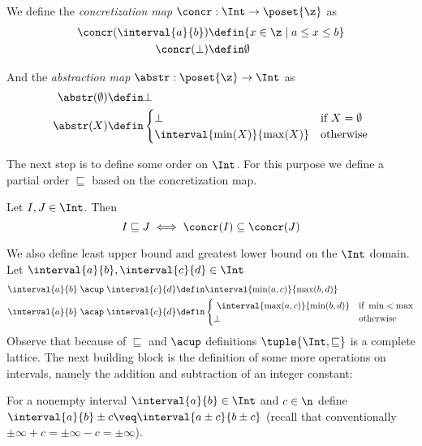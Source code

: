 \begin{definition}\label{def:concrint}
  We define the \emph{concretization map} \(\concr : \Int \to
  \poset{\z}\) as
  \begin{align*}
    \concr(\interval{a}{b}) & \defin \{x\in \z \mid a \leq x \leq b\} \\
    \concr(\bot) & \defin \emptyset
  \end{align*}

  And the \emph{abstraction map} \(\abstr:\poset{\z} \to \Int\) as
  \begin{align*}
    \abstr(\emptyset) & \defin \bot \\
    \abstr(X) & \defin
    \begin{cases}
      \bot & \text{if } X = \emptyset \\
      \interval{\min(X)}{\max(X)} & \text{otherwise}
    \end{cases}
  \end{align*}
\end{definition}
The next step is to define some order on \(\Int\). For this purpose
we define a partial order \(\sqsubseteq\) based on the concretization
map.
\begin{definition}\label{def:intpo}
  Let \(I,J \in \Int\). Then
  \begin{equation*}
    I \sqsubseteq J \iff \concr(I) \subseteq \concr(J)
  \end{equation*}
\end{definition}
We also define least upper bound and greatest lower bound on the
\(\Int\) domain. Let \({\interval{a}{b}, \interval{c}{d}\in \Int}\)
\begin{align*}
  \interval{a}{b} \; \acup \; \interval{c}{d} & \defin \interval{\min(a,c)}{\max(b,d)} \\
  \interval{a}{b} \; \acap \; \interval{c}{d} & \defin
                                                \begin{cases} \
                                                  \interval{\max(a,c)}{\min(b,d)} & \text{if } \min < \max \\
                                                  \bot & \text{otherwise}
                                                \end{cases}
\end{align*}
\noindent
Observe that because of \(\sqsubseteq\) and \(\acup\) definitions
\(\tuple{\Int,\sqsubseteq}\) is a complete lattice.  The next building
block is the definition of some more operations on intervals, namely
the addition and subtraction of an integer constant:

\begin{definition}
  For a nonempty interval \(\interval{a}{b} \in \Int\) and
  \(c \in \n\) define
  \(\interval{a}{b} \pm c \veq \interval{a\pm c}{b\pm c}\) (recall
  that conventionally \(\pm \infty + c = \pm\infty - c = \pm\infty\)).
\end{definition}

